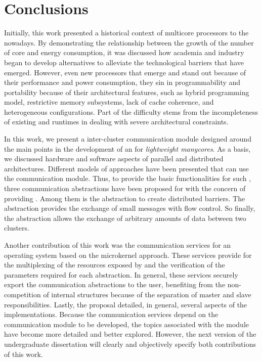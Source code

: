 \chapter{Conclusions}
\label{ch.conclusions}

Initially, this work presented a historical context of multicore
processors to the nowadays.
By demonstrating the relationship between the growth of the number
of core and energy consumption, it was discussed how academia and
industry began to develop alternatives to alleviate the technological
barriers that have emerged.
However, even new processors that emerge and stand out because of
their performance and power consumption,
they sin in programmability and portability because of their architectural
features, such as hybrid programming model, restrictive memory subsystems,
lack of cache coherence, and heterogeneous configurations.
Part of the difficulty stems from the incompleteness of existing \oss and
runtimes in dealing with severe architectural constraints.

In this work, we present a inter-cluster communication module
designed around the main points in the development of an \os for \textit{lightweight manycores}.
As a basis, we discussed hardware and software aspects of parallel
and distributed architectures.
Different models of \os approaches have been presented that can
use the communication module.
Thus, to provide the basic functionalities for such \oss, three
communication abstractions have been proposed for \hal with the
concern of providing \qos.
Among them is the \sync abstraction to create distributed barriers.
The \mailbox abstraction provides the exchange of small messages
with flow control.
So finally, the \portal abstraction allows the exchange of
arbitrary amounts of data between two clusters.

Another contribution of this work was the communication services
for an operating system based on the microkernel approach.
These services provide for the multiplexing of the resources
exposed by \hal and the verification of the parameters required
for each abstraction.
In general, these services securely export the communication
abstractions to the user, benefiting from the non-competition
of \os internal structures because of the separation of master
and slave responsibilities.
Lastly, the proposal detailed, in general, several aspects of
the implementations.
Because the communication services depend on the \hal communication
module to be developed, the topics associated with
the module have become more detailed and better explored.
However, the next version of the undergraduate dissertation
will clearly and objectively specify both contributions of this work.
